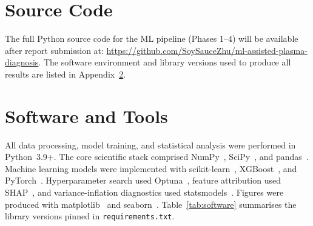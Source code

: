 \documentclass[12pt, a4paper]{article}
\begin{document}
\newpage
\begin{appendices}

\section{Source Code}
\label{app:code}

The full Python source code for the ML pipeline (Phases 1--4) will be available after report submission at: \url{https://github.com/SoySauceZhu/ml-assisted-plasma-diagnosis}. The software environment and library versions used to produce all results are listed in Appendix~\ref{app:software}.

\section{Software and Tools}
\label{app:software}

All data processing, model training, and statistical analysis were performed in Python~3.9+. The core scientific stack comprised NumPy~\cite{harris2020array}, SciPy~\cite{2020SciPy-NMeth}, and pandas~\cite{mckinney-proc-scipy-2010}. Machine learning models were implemented with scikit-learn~\cite{scikit-learn}, XGBoost~\cite{chen2016xgboost}, and PyTorch~\cite{paszke2019pytorch}. Hyperparameter search used Optuna~\cite{optuna2019}, feature attribution used SHAP~\cite{lundberg2017unified}, and variance-inflation diagnostics used statsmodels~\cite{seabold2010statsmodels}. Figures were produced with matplotlib~\cite{Hunter2007} and seaborn~\cite{Waskom2021}. Table~\ref{tab:software} summarises the library versions pinned in \texttt{requirements.txt}.


\end{appendices}
\end{document}
